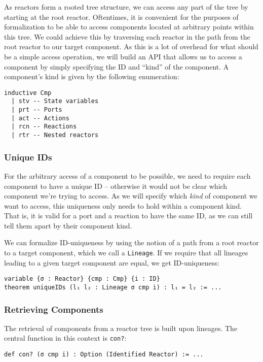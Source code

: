 As reactors form a rooted tree structure, we can access any part of the tree by starting at the root reactor.
Oftentimes, it is convenient for the purposes of formalization to be able to access components located at arbitrary points within this tree.
We could achieve this by traversing each reactor in the path from the root reactor to our target component. 
As this is a lot of overhead for what should be a simple access operation, we will build an API that allows us to access a component by simply specifying the ID and ``kind'' of the component.
A component's kind is given by the following enumeration:

\begin{lstlisting}
inductive Cmp
  | stv -- State variables
  | prt -- Ports
  | act -- Actions
  | rcn -- Reactions
  | rtr -- Nested reactors
\end{lstlisting}

\subsubsection{Unique IDs}

For the arbitrary access of a component to be possible, we need to require each component to have a unique ID -- otherwise it would not be clear which component we're trying to access.
As we will specify which \emph{kind} of component we want to access, this uniqueness only needs to hold within a component kind.
That is, it is valid for a port and a reaction to have the same ID, as we can still tell them apart by their component kind.

We can formalize ID-uniqueness by using the notion of a path from a root reactor to a target component, which we call a \lstinline{Lineage}.
If we require that all lineages leading to a given target component are equal, we get ID-uniqueness:

\begin{lstlisting}
variable {σ : Reactor} {cmp : Cmp} {i : ID}
theorem uniqueIDs (l₁ l₂ : Lineage σ cmp i) : l₁ = l₂ := ...
\end{lstlisting}

\subsubsection{Retrieving Components}

The retrieval of components from a reactor tree is built upon lineages.
The central function in this context is \lstinline{con?}:

\begin{lstlisting}
def con? (σ cmp i) : Option (Identified Reactor) := ...
\end{lstlisting}

